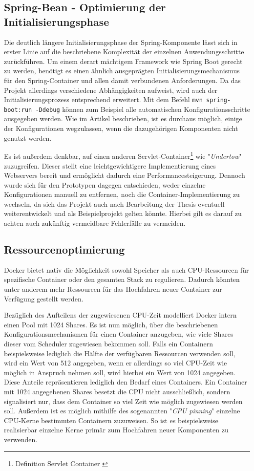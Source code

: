\subsection{Spring-Bean - Optimierung der Initialisierungsphase}
\label{ss:spring-perf}

Die deutlich längere Initialisierungsphase der Spring-Komponente lässt sich in erster Linie auf die beschriebene Komplexität der einzelnen Anwendungsschritte zurückführen. Um einem derart mächtigem Framework wie Spring Boot gerecht zu werden, benötigt es einen ähnlich ausgeprägten Initialisierungsmechanismus für den Spring-Container und allen damit verbundenen Anforderungen. Da das Projekt allerdings verschiedene Abhängigkeiten aufweist, wird auch der Initialisierungsprozess entsprechend erweitert. Mit dem Befehl \verb+mvn spring-boot:run -Ddebug+ können zum Beispiel alle automatischen Konfigurationsschritte ausgegeben werden. Wie im Artikel \cite{spring-perf} beschrieben, ist es durchaus möglich, einige der Konfigurationen wegzulassen, wenn die dazugehörigen Komponenten nicht genutzt werden. 

Es ist außerdem denkbar, auf einen anderen Servlet-Container\footnote{Definition Servlet Container \cite{servlet-container-def}} wie "\emph{Undertow}" zuzugreifen. Dieser stellt eine leichtgewichtigere Implementierung eines Webservers bereit und ermöglicht dadurch eine Performancesteigerung. Dennoch wurde sich für den Prototypen dagegen entschieden, weder einzelne Konfigurationen manuell zu entfernen, noch die Container-Implementierung zu wechseln, da sich das Projekt auch nach Bearbeitung der Thesis eventuell weiterentwickelt und als Beispielprojekt gelten könnte. Hierbei gilt es darauf zu achten auch zukünftig vermeidbare Fehlerfälle zu vermeiden.


\subsection{Ressourcenoptimierung}
\label{par:resOpt}
Docker bietet nativ die Möglichkeit sowohl Speicher als auch CPU-Ressourcen für spezifische Container oder den gesamten Stack zu regulieren. Dadurch könnten unter anderem mehr Ressourcen für das Hochfahren neuer Container zur Verfügung gestellt werden.

Bezüglich des Aufteilens der zugewiesenen CPU-Zeit modelliert Docker intern einen Pool mit 1024 Shares. Es ist nun möglich, über die beschriebenen Konfigurationsmechanismen für einen Container anzugeben, wie viele Shares dieser vom Scheduler zugewiesen bekommen soll. Falls ein Containern beispielsweise lediglich die Hälfte der verfügbaren Ressourcen verwenden soll, wird ein Wert von 512 angegeben, wenn er allerdings so viel CPU-Zeit wie möglich in Anspruch nehmen soll, wird hierbei ein Wert von 1024 angegeben. Diese Anteile repräsentieren lediglich den Bedarf eines Containers. Ein Container mit 1024 angegebenen Shares besetzt die CPU nicht ausschließlich, sondern signalisiert nur, dass dem Container so viel Zeit wie möglich zugewiesen werden soll. Außerdem ist es möglich mithilfe des sogenannten "\emph{CPU pinning}" einzelne CPU-Kerne bestimmten Containern zuzuweisen. So ist es beispielsweise realisierbar einzelne Kerne primär zum Hochfahren neuer Komponenten zu verwenden. 

